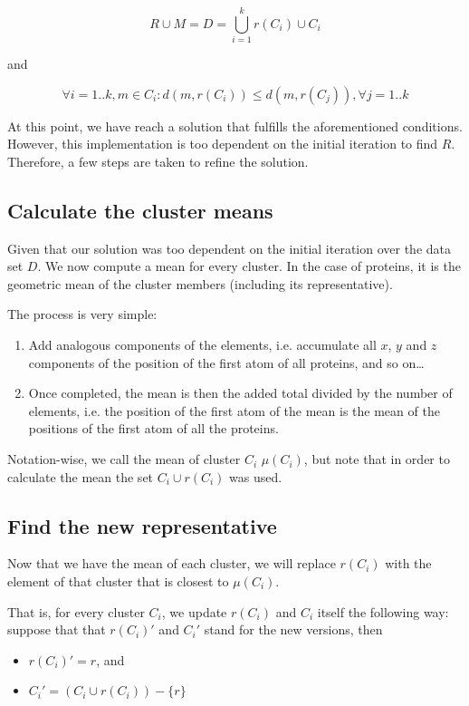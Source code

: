 \documentclass[a4paper,12pt,english]{report}
\begin{document}
$$R \cup M = D = \bigcup_{i=1}^{k} r(C_i) \cup C_i$$

and

$$\forall i=1..k, m \in C_i : d(m,r(C_i)) \leq d(m,r(C_j)), \forall j=1..k$$

At this point, we have reach a solution that fulfills the aforementioned conditions. However, this implementation is too dependent on the initial iteration to find $R$. Therefore, a few steps are taken to refine the solution.

\subsection{Calculate the cluster means}

Given that our solution was too dependent on the initial iteration over the data set $D$. We now compute a mean for every cluster. In the case of proteins, it is the geometric mean of the cluster members (including its representative).

The process is very simple:
\begin{enumerate}
\item Add analogous components of the elements, i.e. accumulate all $x$, $y$ and $z$ components of the position of the first atom of all proteins, and so on\ldots
\item Once completed, the mean is then the added total divided by the number of elements, i.e. the position of the first atom of the mean is the mean of the positions of the first atom of all the proteins.
\end{enumerate}

Notation-wise, we call the mean of cluster $C_i$ $\mu(C_i)$, but note that in order to calculate the mean the set $C_i \cup r(C_i)$ was used.

\subsection{Find the new representative}

Now that we have the mean of each cluster, we will replace $r(C_i)$ with the element of that cluster that is closest to $\mu(C_i)$.

That is, for every cluster $C_i$, we update $r(C_i)$ and $C_i$ itself the following way: suppose that that $r(C_i)'$ and $C_i '$ stand for the new versions, then
\begin{itemize}
\item $r(C_i)' = r$, and
\item $C_i' = (C_i \cup r(C_i)) - \{r\}$
\end{itemize}
\end{document}
